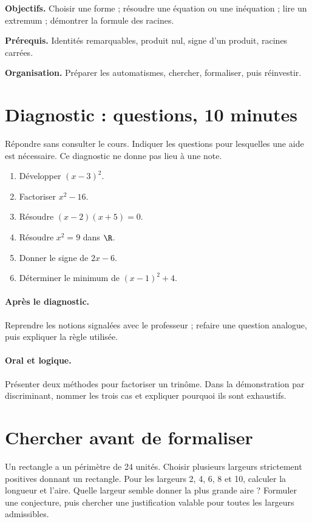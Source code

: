 \label{C02}
\begin{keypoint}
\textbf{Objectifs.} Choisir une forme ; résoudre une équation ou une inéquation ; lire un extremum ; démontrer la formule des racines.

\textbf{Prérequis.} Identités remarquables, produit nul, signe d’un produit, racines carrées.

\textbf{Organisation.} Préparer les automatismes, chercher, formaliser, puis réinvestir.\end{keypoint}
\section*{Diagnostic :  questions, 10 minutes}\label{C02-D}
Répondre sans consulter le cours. Indiquer les questions pour lesquelles une aide est nécessaire. Ce diagnostic ne donne pas lieu à une note.
\begin{enumerate}
\item Développer $(x-3)^2$.
\item Factoriser $x^2-16$.
\item Résoudre $(x-2)(x+5)=0$.
\item Résoudre $x^2=9$ dans $\R$.
\item Donner le signe de $2x-6$.
\item Déterminer le minimum de $(x-1)^2+4$.
\end{enumerate}
\paragraph{Après le diagnostic.} Reprendre les notions signalées avec le professeur ; refaire une question analogue, puis expliquer la règle utilisée.
\paragraph{Oral et logique.} Présenter deux méthodes pour factoriser un trinôme. Dans la démonstration par discriminant, nommer les trois cas et expliquer pourquoi ils sont exhaustifs.
\mxnewpage
\section*{Chercher avant de formaliser}\label{C02-RECH}
Un rectangle a un périmètre de 24 unités. Choisir plusieurs largeurs strictement positives donnant un rectangle. Pour les largeurs 2, 4, 6, 8 et 10, calculer la longueur et l’aire. Quelle largeur semble donner la plus grande aire ? Formuler une conjecture, puis chercher une justification valable pour toutes les largeurs admissibles.
